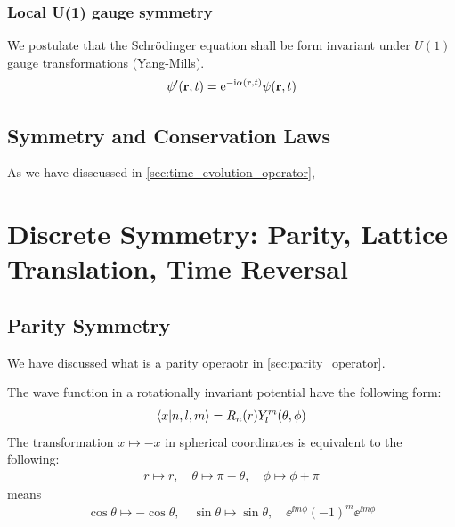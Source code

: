 \subsubsection{Local U(1) gauge symmetry}
We postulate that the Schrödinger equation shall be form invariant under $U(1)$ gauge transformations (Yang-Mills). 
\begin{align*}
    \psi'(\mathbf{r},t) = \mathrm{e}^{- \mathrm{i} \alpha(\mathbf{r},t)} \psi(\mathbf{r},t)
\end{align*}
\subsection{Symmetry and Conservation Laws}

As we have disscussed in \cref{sec:time_evolution_operator}, 

\newpage
\section{Discrete Symmetry: Parity, Lattice Translation, Time Reversal}
\subsection{Parity Symmetry}
We have discussed what is a parity operaotr in \cref{sec:parity_operator}. 

The wave function in a rotationally invariant potential have the following form:
\begin{align*}
    \braket{x|n,l,m} = R_n(r) Y_l^m(\theta, \phi)
\end{align*}
The transformation $x \mapsto -x$ in spherical coordinates is equivalent to the following: 
\begin{align*}
    r \mapsto r,\quad \theta \mapsto \pi - \theta ,\quad\phi \mapsto \phi + \pi
\end{align*}
means 
\begin{align*}
    \cos \theta \mapsto - \cos \theta, \quad \sin \theta \mapsto \sin \theta, \quad \ee^{\ii m \phi} (-1)^m \ee^{\ii m \phi}
\end{align*}

